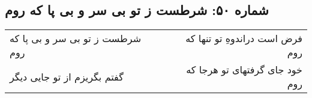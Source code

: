\begin{center}
\section*{شماره ۵۰: شرطست ز تو بی سر و بی پا که روم}
\label{sec:050}
\begin{longtable}{l p{0.5cm} r}
شرطست ز تو بی سر و بی پا که روم
&&
فرض است دراندوهِ تو تنها که روم
\\
گفتم بگریزم از تو جایی دیگر
&&
خود جای گرفتهای تو هرجا که روم
\\
\end{longtable}
\end{center}
